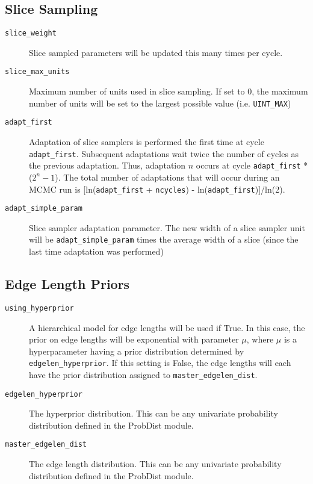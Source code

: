 \documentclass[10pt]{article}
\begin{document}
\subsection{Slice Sampling}
\begin{description}
\item[{\tt slice\_weight}] Slice sampled parameters will be updated this many times per cycle.
\item[{\tt slice\_max\_units}] Maximum number of units used in slice sampling. If set to 0, the maximum number of units will be set to the largest possible value (i.e. \verb+UINT_MAX+)
\item[{\tt adapt\_first}] Adaptation of slice samplers is performed the first time at cycle \verb+adapt_first+. Subsequent adaptations wait twice the number of cycles as the previous adaptation. Thus, adaptation $n$ occurs at cycle \verb+adapt_first+ * ($2^n - 1$). The total number of adaptations that will occur during an MCMC run is [ln(\verb+adapt_first+ + \verb+ncycles+) - ln(\verb+adapt_first+)]/ln(2).
\item[{\tt adapt\_simple\_param}] Slice sampler adaptation parameter. The new width of a slice sampler unit will be \verb+adapt_simple_param+ times the average width of a slice (since the last time adaptation was performed)
\end{description}

\subsection{Edge Length Priors}
\begin{description}
\item[{\tt using\_hyperprior}] A hierarchical model for edge lengths will be used if True. In this case, the prior on edge lengths will be exponential with parameter $\mu$, where $\mu$ is a hyperparameter having a prior distribution determined by \verb+edgelen_hyperprior+. If this setting is False, the edge lengths will each have the prior distribution assigned to \verb+master_edgelen_dist+.
\item[{\tt edgelen\_hyperprior}] The hyperprior distribution. This can be any univariate probability distribution defined in the ProbDist module.
\item[{\tt master\_edgelen\_dist}] The edge length distribution.  This can be any univariate probability distribution defined in the ProbDist module.
\end{description}
\end{document}
